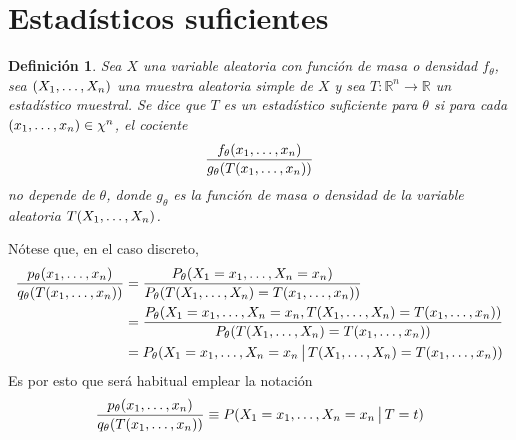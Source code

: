 \documentclass[11pt]{report}
\newtheorem{definition}{Definición}
\theoremstyle{definition}
\newcommand{\R}{\mathbb R}
\begin{document}
\section{Estadísticos suficientes}

\begin{definition}
Sea $X$ una variable aleatoria con función de masa o densidad $f_\theta$, sea $(X_1,\mathellipsis,X_n)$ una muestra aleatoria simple de $X$ y sea $T \colon \R^n \to \R$ un estadístico muestral. Se dice que $T$ es un \emph{estadístico suficiente para $\theta$} si para cada $(x_1,\mathellipsis,x_n) \in \chi^n$, el cociente
    \[\frac{f_\theta(x_1,\mathellipsis,x_n)}{g_\theta(T(x_1,\mathellipsis,x_n))} \]
    no depende de $\theta$, donde $g_\theta$ es la función de masa o densidad de la variable aleatoria $T(X_1,\mathellipsis,X_n)$.
\end{definition}

Nótese que, en el caso discreto,
\[\begin{aligned}[t]
\frac{p_\theta(x_1,\mathellipsis,x_n)}{q_\theta(T(x_1,\mathellipsis,x_n))}  &= \frac{P_\theta(X_1=x_1,\mathellipsis,X_n=x_n)}{P_\theta(T(X_1,\mathellipsis,X_n) = T(x_1,\mathellipsis,x_n))} \\
&= \frac{P_\theta(X_1=x_1,\mathellipsis,X_n=x_n,T(X_1,\mathellipsis,X_n) = T(x_1,\mathellipsis,x_n))}{P_\theta(T(X_1,\mathellipsis,X_n) = T(x_1,\mathellipsis,x_n))} \\
&=P_\theta(X_1=x_1,\mathellipsis,X_n=x_n \, \big| \, T(X_1,\mathellipsis,X_n) = T(x_1,\mathellipsis,x_n))
\end{aligned}
\]
Es por esto que será habitual emplear la notación
\[\frac{p_\theta(x_1,\mathellipsis,x_n)}{q_\theta(T(x_1,\mathellipsis,x_n))} \equiv P(X_1=x_1,\mathellipsis,X_n=x_n \, \big| \, T=t)\]
\end{document}
